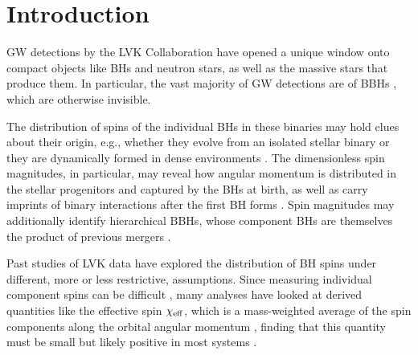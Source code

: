 \documentclass[twocolumn,usenames,dvipsnames,linenumbers]{aastex631}
\begin{document}
\section{Introduction}


\Ac{GW} detections by the \ac{LVK} Collaboration \citep{LIGOScientific:2014pky,VIRGO:2014yos,KAGRA:2020tym}
have opened a unique window onto compact objects like \acp{BH} and neutron stars, as well as the massive stars that produce them.
In particular, the vast majority of \ac{GW} detections are of \acp{BBH} 
\citep{LIGOScientific:2018mvr,LIGOScientific:2020ibl,LIGOScientific:2021usb,KAGRA:2021vkt,Nitz:2018imz,Nitz:2020oeq,Nitz:2021uxj,Nitz:2021zwj,Zackay:2019tzo,Venumadhav:2019tad,Venumadhav:2019lyq,Zackay:2019btq,Olsen:2022pin,Mehta:2023zlk}, 
which are otherwise invisible.

The distribution of spins of the individual \acp{BH} in these binaries may hold clues about their origin, e.g., whether they evolve from an isolated stellar binary or they are dynamically formed in dense environments \citep[see, e.g., reviews by][]{Mapelli:2018uds,Mandel:2018hfr}.
The dimensionless spin magnitudes, in particular, may reveal how angular momentum is distributed in the stellar progenitors and captured by the \acp{BH} at birth, as well as carry imprints of binary interactions after the first \ac{BH} forms \citep{Belczynski:2017gds,Qin:2018vaa,Fuller:2019ckz,Fuller:2019sxi,Ma:2019cpr,Bavera:2020inc,2021A&A...647A.153B,2021PhRvD.103f3032S,Zevin:2022wrw,Marchant:2023ncp}.
Spin magnitudes may additionally identify hierarchical \acp{BBH}, whose component \acp{BH} are themselves the product of previous mergers \citep{2017PhRvD..95l4046G,2019PhRvD.100d3027R,2020ApJ...900..177K,2021ApJ...915L..35K,2020ApJ...893...35D,2021NatAs...5..749G,2024MNRAS.531.3479M,Payne:2024ywe}.

Past studies of \ac{LVK} data have explored the distribution of \ac{BH} spins under different, more or less restrictive, assumptions.
Since measuring individual component spins can be difficult \citep{vanderSluys:2007st,Raymond:2009cv,Cho:2012ed,OShaughnessy:2014shr,Vitale:2014mka,Ghosh:2015jra,Chatziioannou:2018wqx,Pratten:2020igi,Green:2020ptm,Biscoveanu:2020are,Biscoveanu:2021nvg,Varma:2021csh,Miller:2023ncs,Miller:2024sui}, many analyses have looked at derived quantities like the effective spin $\chi_{\rm eff}$, which is a mass-weighted average of the spin components along the orbital angular momentum \citep{Damour:2001,Ajith:2009bn}, finding that this quantity must be small but likely positive in most systems \citep[e.g.,][]{LIGOScientific:2020kqk,KAGRA:2021duu,KAGRA:2021duu,Miller:2020zox,Callister:2021fpo,Roulet:2021hcu,Adamcewicz:2022hce,Biscoveanu:2022qac,Franciolini:2022iaa, Garciabellido:2021}.
\end{document}
